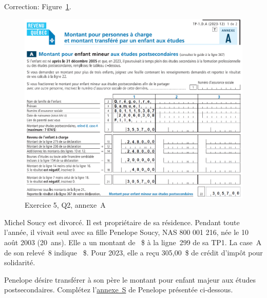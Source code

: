 Correction: Figure~\ref{fig:chap4Exercice5Q2AnnexeA}.
\begin{figure}
	\centering
	\includegraphics[width=.9\textwidth]{exercice/4-5/Q2/Annexe-A.png}
	\caption[]{Exercice 5, Q2, annexe~A}
	\label{fig:chap4Exercice5Q2AnnexeA}
\end{figure}


\begin{question}
	Michel Soucy est divorcé. Il est propriétaire de sa résidence. Pendant toute l'année, il vivait seul avec sa fille Penelope Soucy, NAS 800 001 216, née le 10 août 2003 (20~ans). Elle a un montant de ~\$ à la ligne~299 de sa TP1. La case~A de son relevé~8 indique ~\$. Pour 2023, elle a reçu 305,00~\$ de crédit d'impôt pour solidarité.
\end{question}
\setcounter{sousQuestion}{0}
\begin{sousQuestion}
	Penelope désire transférer à son père le montant pour enfant majeur aux études postsecondaires. Complétez l'\href{https://www.revenuquebec.ca/documents/fr/formulaires/tp/2023-12/TP-1.D.S%282023-12%29.pdf}{annexe~S} de Penelope présentée ci-dessous.
\end{sousQuestion}

